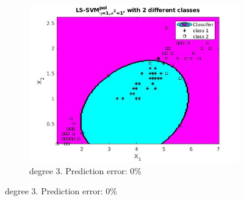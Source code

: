 \documentclass{article}
\begin{document}
\begin{figure}[]
\begin{subfigure}{0.33\linewidth}
            \includegraphics[width=\linewidth]{iris_degree3}
            \caption{degree 3.
Prediction error: 0\%}
        \end{subfigure}



\end{figure}
\end{document}
